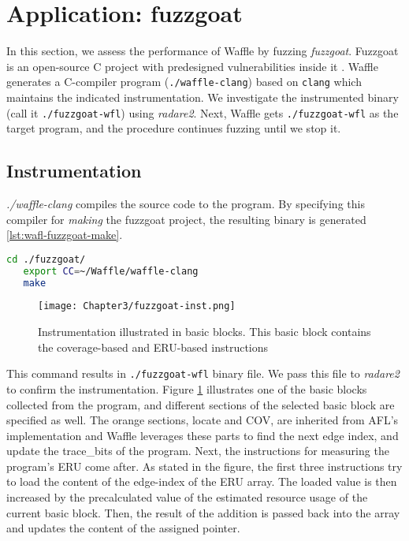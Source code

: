 \section{Application: fuzzgoat}
\label{sec:3-3}

In this section, we assess the performance of Waffle by fuzzing \textit{fuzzgoat}. Fuzzgoat is an open-source C project with predesigned vulnerabilities inside it \cite{fuzzgoat}. Waffle generates a C-compiler program (\texttt{./waffle-clang}) based on \texttt{clang} which maintains the indicated instrumentation. We investigate the instrumented binary (call it \texttt{./fuzzgoat-wfl}) using \textit{radare2}. Next, Waffle gets \texttt{./fuzzgoat-wfl} as the target program, and the procedure continues fuzzing until we stop it. 


\subsection{Instrumentation}

\textit{./waffle-clang} compiles the source code to the program. By specifying this compiler for \textit{making} the fuzzgoat project, the resulting binary is generated \ref{lst:wafl-fuzzgoat-make}.

\begin{lstlisting}[language=bash,style=CommandStyle,label={lst:wafl-fuzzgoat-make}]
   cd ./fuzzgoat/
   export CC=~/Waffle/waffle-clang
   make
\end{lstlisting}


\begin{figure}[!b]
   \texttt{[image: Chapter3/fuzzgoat-inst.png]}
   \centering
   \caption{Instrumentation illustrated in basic blocks. This basic block contains the coverage-based and ERU-based instructions}
   \label{fig:fuzzgoat-inst}
\end{figure}

This command results in \texttt{./fuzzgoat-wfl} binary file. We pass this file to \textit{radare2} to confirm the instrumentation. Figure \ref{fig:fuzzgoat-inst} illustrates one of the basic blocks collected from the program, and different sections of the selected basic block are specified as well. The orange sections, locate and COV, are inherited from AFL's implementation and Waffle leverages these parts to find the next edge index, and update the trace\_bits of the program. Next, the instructions for measuring the program's ERU come after. As stated in the figure, the first three instructions try to load the content of the edge-index of the ERU array. The loaded value is then increased by the precalculated value of the estimated resource usage of the current basic block. Then, the result of the addition is passed back into the array and updates the content of the assigned pointer.


